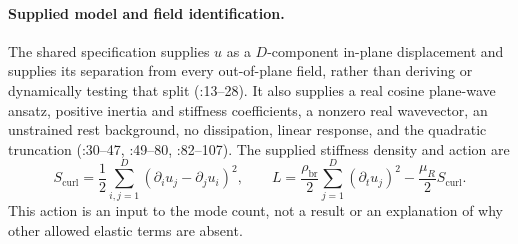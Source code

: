 \paragraph{Supplied model and field identification.}
The shared specification supplies \(u\) as a \(D\)-component in-plane
displacement and supplies its separation from every out-of-plane field, rather
than deriving or dynamically testing that split
(:13--28).
It also supplies a real cosine plane-wave ansatz, positive inertia and stiffness
coefficients, a nonzero real wavevector, an unstrained rest background, no
dissipation, linear response, and the quadratic truncation
(:30--47,
:49--80, :82--107).
The supplied stiffness density and action are
\[
 S_{\mathrm{curl}}
 =\frac12\sum_{i,j=1}^{D}(\partial_i u_j-\partial_j u_i)^2,
 \qquad
 L=\frac{\rho_{\mathrm{br}}}{2}\sum_{j=1}^{D}(\partial_tu_j)^2
   -\frac{\mu_R}{2}S_{\mathrm{curl}}.
\]
This action is an input to the mode count, not a result or an explanation of why
other allowed elastic terms are absent.


